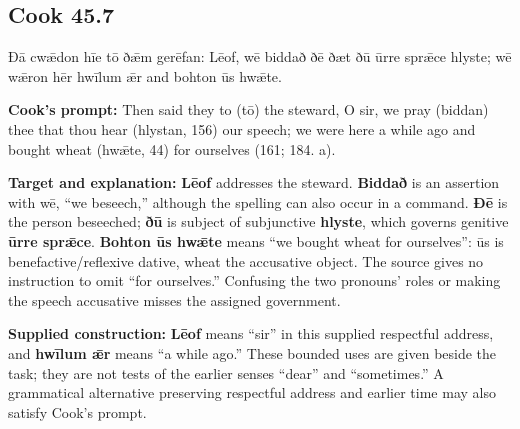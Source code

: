 \par\begin{minipage}{\linewidth}\raggedright
\subsection*{Cook 45.7}

Ðā cwǣdon hīe tō ðǣm gerēfan: Lēof, wē biddað ðē ðæt ðū ūrre sprǣce hlyste; wē wǣron hēr hwīlum ǣr and bohton ūs hwǣte.

\textbf{Cook’s prompt:} Then said they to (tō) the steward, O sir, we pray (biddan) thee that thou hear (hlystan, 156) our speech; we were here a while ago and bought wheat (hwǣte, 44) for ourselves (161; 184. a).

\textbf{Target and explanation:} \textbf{Lēof} addresses the steward. \textbf{Biddað} is an assertion with wē, “we beseech,” although the spelling can also occur in a command. \textbf{Ðē} is the person beseeched; \textbf{ðū} is subject of subjunctive \textbf{hlyste}, which governs genitive \textbf{ūrre sprǣce}. \textbf{Bohton ūs hwǣte} means “we bought wheat for ourselves”: ūs is benefactive/\allowbreak{}reflexive dative, wheat the accusative object. The source gives no instruction to omit “for ourselves.” Confusing the two pronouns’ roles or making the speech accusative misses the assigned government.

\textbf{Supplied construction:} \textbf{Lēof} means “sir” in this supplied respectful address, and \textbf{hwīlum ǣr} means “a while ago.” These bounded uses are given beside the task; they are not tests of the earlier senses “dear” and “sometimes.” A grammatical alternative preserving respectful address and earlier time may also satisfy Cook’s prompt.

\end{minipage}\par\addvspace{4pt}

